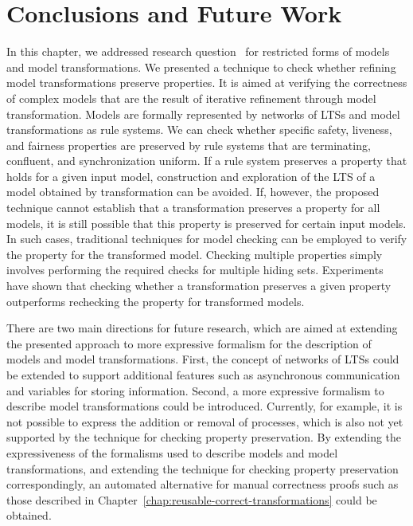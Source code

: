 \section{Conclusions and Future Work}
\label{sec:lts-transformation:conclusions}

In this chapter, we addressed research question~ for restricted forms of models and model transformations.
We presented a technique to check whether refining model transformations preserve properties.
It is aimed at verifying the correctness of complex models that are the result of iterative refinement through model transformation.
Models are formally represented by networks of LTSs and model transformations as rule systems.
We can check whether specific safety, liveness, and fairness properties are preserved by rule systems that are terminating, confluent, and synchronization uniform.
If a rule system preserves a property that holds for a given input model, construction and exploration of the LTS of a model obtained by transformation can be avoided.
If, however, the proposed technique cannot establish that a transformation preserves a property for all models, it is still possible that this property is preserved for certain input models.
In such cases, traditional techniques for model checking can be employed to verify the property for the transformed model.
Checking multiple properties simply involves performing the required checks for multiple hiding sets.
Experiments have shown that checking whether a transformation preserves a given property outperforms rechecking the property for transformed models.

There are two main directions for future research, which are aimed at extending the presented approach to more expressive formalism for the description of models and model transformations.
First, the concept of networks of LTSs could be extended to support additional features such as asynchronous communication and variables for storing information.
Second, a more expressive formalism to describe model transformations could be introduced.
Currently, for example, it is not possible to express the addition or removal of processes, which is also not yet supported by the technique for checking property preservation.
By extending the expressiveness of the formalisms used to describe models and model transformations, and extending the technique for checking property preservation correspondingly, an automated alternative for manual correctness proofs such as those described in Chapter~\ref{chap:reusable-correct-transformations} could be obtained. 